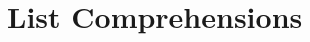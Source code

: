 \documentclass[11pt]{cselabheader}
\begin{document}
%
%
%
%
%

\section{List Comprehensions}
\end{document}
